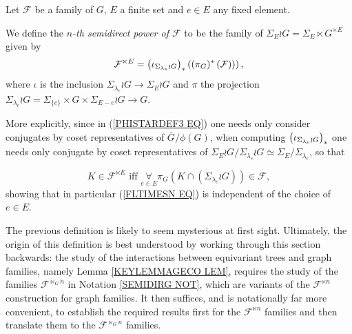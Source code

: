 \documentclass[a4paper,10pt]{article}%
\begin{document}
\begin{definition}
  Let $\mathcal{F}$ be a family of $G$,
  $E$ a finite set and $e \in E$ any fixed element.
  
  We define the \textit{$n$-th semidirect power of $\mathcal{F}$} to be the family of $\Sigma_E \wr G = \Sigma_E \ltimes G^{\times E}$ given by
  \begin{equation}\label{FLTIMESN EQ}
    \mathcal{F}^{\ltimes E}
    =
    \left(
      \iota_{\Sigma_{\lambda_e} \wr G}
    \right)_{\**}
    \left(
      \left(
        \pi_{G})^{\**}\left(\mathcal{F}\right)
      \right)
    \right),
  \end{equation}
  where $\iota$ is the inclusion 
  $\Sigma_{\lambda_e} \wr G
  \to 
  \Sigma_E \wr G$
  and $\pi$ the projection
  $\Sigma_{\lambda_e} \wr G = \Sigma_{\{e\}} \times G \times \Sigma_{E-e} \wr G
  \to G$.


  More explicitly, since in (\ref{PHISTARDEF3 EQ}) one needs only consider conjugates by coset representatives of $\bar{G}/\phi(G)$, when computing 
  $\left( \iota_{\Sigma_{\lambda_e} \wr G}\right)_{\**}$
  one needs only conjugate by coset representatives of 
  $\Sigma_E \wr G/\Sigma_{\lambda_e} \wr G \simeq \Sigma_E/\Sigma_{\lambda_e}$, so that

  \begin{equation}\label{FLTIMESN2 EQ}
    K \in \mathcal{F}^{\ltimes E} 
    \text{ iff }
    \underset{e \in E}{\forall} \pi_{G}
    \left(
      K \cap \left( \Sigma_{\lambda_e} \wr G \right)
    \right)
    \in \mathcal{F},
  \end{equation}
  showing that in particular (\ref{FLTIMESN EQ})
  is independent of the choice of $e \in E$.
\end{definition}



\begin{remark}
  The previous definition is likely to seem mysterious at first sight. Ultimately, the origin of this definition
  is best understood by working through this section backwards:
  the study of the interactions between equivariant trees and graph families, namely Lemma \ref{KEYLEMMAGECO LEM}, requires the study of the families $\mathcal{F}^{\ltimes_G n}$ in Notation \ref{SEMIDIRG NOT}, which are variants of the $\mathcal{F}^{\ltimes n}$ construction for graph families.
  It then suffices, and is notationally far more convenient, to establish the required results first for the $\mathcal{F}^{\ltimes n}$ families and then translate them to the $\mathcal{F}^{\ltimes_G n}$ families.
\end{remark}
\end{document}
